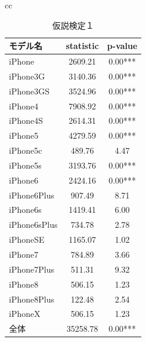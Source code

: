 \documentclass[uplatex,11pt]{jsarticle}
\begin{document}
\begin{table}[hb]
    \begin{center}
        \begin{tabular}{cc}

            \begin{minipage}{0.5\hsize}
                \begin{center}
                    \caption{仮説検定１}
                        \begin{tabular}{|l|cc|}
                            \hline
                            モデル名         & statistic & p-value \\ \hline
                            iPhone       & 2609.21   & 0.00***    \\
                            iPhone3G     & 3140.36   & 0.00***    \\
                            iPhone3GS    & 3524.96   & 0.00***    \\
                            iPhone4      & 7908.92   & 0.00***    \\
                            iPhone4S     & 2614.31   & 0.00***    \\
                            iPhone5      & 4279.59   & 0.00***    \\
                            iPhone5c     & 489.76    & 4.47    \\
                            iPhone5s     & 3193.76   & 0.00***    \\
                            iPhone6      & 2424.16   & 0.00***    \\
                            iPhone6Plus  & 907.49    & 8.71    \\
                            iPhone6s     & 1419.41   & 6.00    \\
                            iPhone6sPlus & 734.78    & 2.78    \\
                            iPhoneSE     & 1165.07   & 1.02    \\
                            iPhone7      & 784.89    & 3.66    \\
                            iPhone7Plus  & 511.31    & 9.32    \\
                            iPhone8      & 506.15    & 1.23    \\
                            iPhone8Plus  & 122.48    & 2.54    \\
                            iPhoneX      & 506.15    & 1.23    \\
                            全体         & 35258.78  & 0.00***   \\ \hline
                        \end{tabular}
                \end{center}
            \end{minipage}


\end{tabular}
\end{center}
\end{table}
\end{document}
